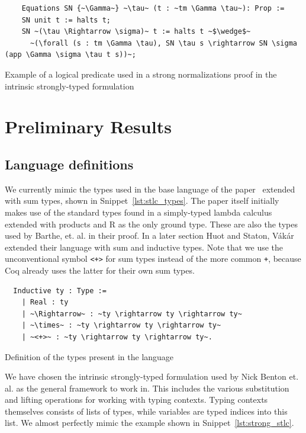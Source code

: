 \documentclass[11pt, final]{article}
\def\Vakar{V\'{a}k\'{a}r}
\begin{document}
\begin{listing}
  \begin{verbatim}
    Equations SN {~\Gamma~} ~\tau~ (t : ~tm \Gamma \tau~): Prop :=
    SN unit t := halts t;
    SN ~(\tau \Rightarrow \sigma)~ t := halts t ~$\wedge$~
      ~(\forall (s : tm \Gamma \tau), SN \tau s \rightarrow SN \sigma (app \Gamma \sigma \tau t s))~;
  \end{verbatim}
  \caption{Example of a logical predicate used in a strong normalizations proof in the intrinsic strongly-typed formulation}
  \label{lst:sn_logical_relation}
\end{listing}

\section{Preliminary Results}

\subsection{Language definitions}

We currently mimic the types used in the base language of the paper~\cite{huot2020correctness} extended with sum types, shown in Snippet~\ref{lst:stlc_types}.
The paper itself initially makes use of the standard types found in a simply-typed lambda calculus extended with products and R as the only ground type.
These are also the types used by Barthe, et. al.\cite{barthe2020versatility} in their proof. In a later section Huot and Staton, \Vakar{} extended their language with sum and inductive types.
Note that we use the unconventional symbol \texttt{<+>} for sum types instead of the more common \texttt{+}, because Coq already uses the latter for their own sum types.

\begin{listing}
  \begin{verbatim}
  Inductive ty : Type :=
    | Real : ty
    | ~\Rightarrow~ : ~ty \rightarrow ty \rightarrow ty~
    | ~\times~ : ~ty \rightarrow ty \rightarrow ty~
    | ~<+>~ : ~ty \rightarrow ty \rightarrow ty~.
  \end{verbatim}
  \caption{Definition of the types present in the language}
  \label{lst:stlc_types}
\end{listing}

We have chosen the intrinsic strongly-typed formulation used by Nick Benton et. al.\cite{Benton2011} as the general framework to work in.
This includes the various substitution and lifting operations for working with typing contexts. Typing contexts themselves consists of lists of types, while variables are typed indices into this list. We almost perfectly mimic the example shown in Snippet~\ref{lst:strong_stlc}.
\end{document}
